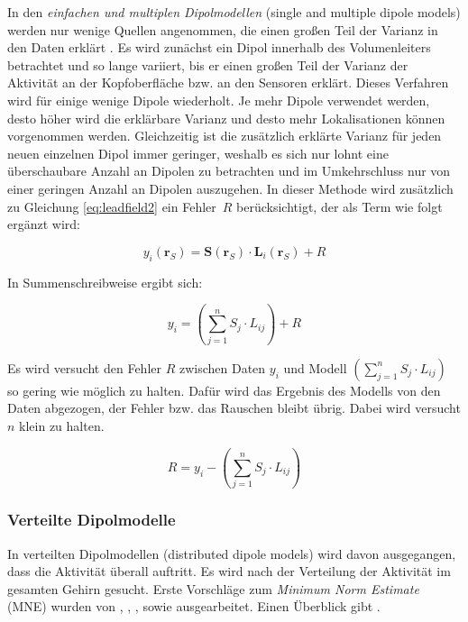 \documentclass[doc,a4paper,12pt]{apa6}
\newcommand{\mx}[1]{\mathbf{#1}}
\begin{document}
In den \emph{einfachen und multiplen Dipolmodellen} (single and multiple dipole models) werden nur wenige Quellen angenommen, die einen großen Teil der Varianz in den Daten erklärt \parencite{scherg1990fundamentals}. Es wird zunächst ein Dipol innerhalb des Volumenleiters betrachtet und so lange variiert, bis er einen großen Teil der Varianz der Aktivität an der Kopfoberfläche bzw. an den Sensoren erklärt. Dieses Verfahren wird für einige wenige Dipole wiederholt. Je mehr Dipole verwendet werden, desto höher wird die erklärbare Varianz und desto mehr Lokalisationen können vorgenommen werden. Gleichzeitig ist die zusätzlich erklärte Varianz für jeden neuen einzelnen Dipol immer geringer, weshalb es sich nur lohnt eine überschaubare Anzahl an Dipolen zu betrachten und im Umkehrschluss nur von einer geringen Anzahl an Dipolen auszugehen. In dieser Methode wird zusätzlich zu Gleichung \ref{eq:leadfield2} ein Fehler~$R$ berücksichtigt, der als Term wie folgt ergänzt wird:

\begin{equation}
\label{eq:leadfield-error}
y_i(\mx{r}_S) = \mx{S}(\mx{r}_S) \cdot \mx{L}_i(\mx{r}_S) + R
\end{equation}

In Summenschreibweise ergibt sich:

\begin{equation}
\label{eq:leadfield-error-sum}
y_i = \left( \sum_{j=1}^n S_j \cdot L_{ij} \right) + R
\end{equation}

Es wird versucht den Fehler $R$ zwischen Daten $y_i$ und Modell $\left( \sum_{j=1}^n S_j \cdot L_{ij} \right)$ so gering wie möglich zu halten. Dafür wird das Ergebnis des Modells von den Daten abgezogen, der Fehler bzw. das Rauschen bleibt übrig. Dabei wird versucht $n$ klein zu halten.

\begin{equation}
R = y_i - \left( \sum_{j=1}^n S_j \cdot L_{ij} \right)
\end{equation}

\subsubsection{Verteilte Dipolmodelle}

In verteilten Dipolmodellen (distributed dipole models) wird davon ausgegangen, dass die Aktivität überall auftritt. Es wird nach der Verteilung der Aktivität im gesamten Gehirn gesucht. Erste Vorschläge zum \emph{Minimum Norm Estimate} (MNE) wurden von \textcite{hamalainen1984interpreting}, \textcite{ilmoniemi1985forward}, \textcite{sarvas1987basic}, sowie \textcite{hamalainen1994interpreting} ausgearbeitet. Einen Überblick gibt \textcite{hamalainen1993magnetoencephalography}.
\end{document}
